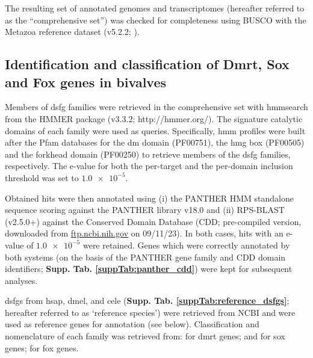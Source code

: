 \documentclass[../main.tex]{subfiles}
\begin{document}
The resulting set of annotated genomes and transcriptomes (hereafter referred to as the “comprehensive set”) was checked for completeness using BUSCO with the Metazoa reference dataset (v5.2.2; \textbf{\cite{manni2021busco}}).

\subsection{Identification and classification of Dmrt, Sox and Fox genes in bivalves}
Members of \gls{dsfg} families were retrieved in the comprehensive set with hmmsearch from the HMMER package (v3.3.2; http://hmmer.org/). The signature catalytic domains of each family were used as queries. Specifically, \gls{hmm} profiles were built after the Pfam databases for the \gls{dm} domain (PF00751), the \gls{hmg} box (PF00505) and the forkhead domain (PF00250) to retrieve members of the \gls{dsfg} families, respectively. The e-value for both the per-target and the per-domain inclusion threshold was set to $\num{1.0e-5}$.

Obtained hits were then annotated using (i) the PANTHER HMM standalone sequence scoring against the PANTHER library v18.0 and (ii) RPS-BLAST (v2.5.0+) against the Conserved Domain Database (CDD; pre-compiled version, downloaded from \href{https://ftp.ncbi.nih.gov/pub/mmdb/cdd/little_endian/}{ftp.ncbi.nih.gov} on 09/11/23). In both cases, hits with an e-value of $\num{1.0e-5}$ were retained. Genes which were correctly annotated by both systems (on the basis of the PANTHER gene family and CDD domain identifiers; \textbf{Supp. Tab. \ref{suppTab:panther_cdd}}) were kept for subsequent analyses.

\glspl{dsfg} from \gls{hsap}, \gls{dmel}, and \gls{cele} (\textbf{Supp. Tab. \ref{suppTab:reference_dsfgs}}; hereafter referred to as ‘reference species’) were retrieved from NCBI and were used as reference genes for annotation (see below). Classification and nomenclature of each family was retrieved from: \textbf{\cite{mawaribuchi2019independent}} for \gls{dmrt} genes; \textbf{\cite{phochanukul2010no}} and \textbf{\cite{sarkar2013sox}} for \gls{sox} genes; \textbf{\cite{mazet2003phylogenetic}} for \gls{fox} genes.
\end{document}
